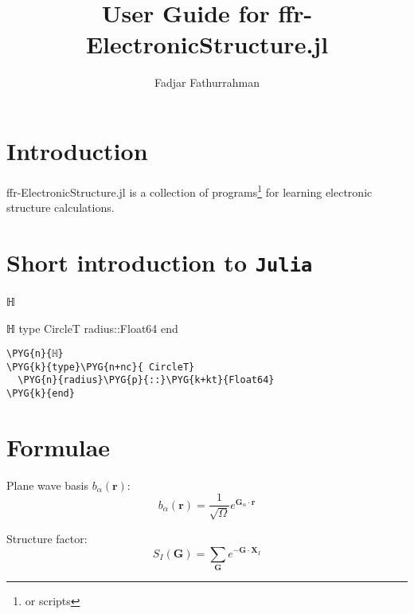 \documentclass[a4paper,12pt]{extarticle}
\begin{document}
\title{User Guide for {\ttfamily ffr-ElectronicStructure.jl}}
\author{Fadjar Fathurrahman}
\date{}
\maketitle

\tableofcontents

\section{Introduction}

{\ttfamily ffr-ElectronicStructure.jl} is a collection of programs\footnote{or scripts}
for learning electronic structure calculations.


\section{Short introduction to {\tt Julia}}

ℍ

\begin{juliacode}
ℍ
type CircleT
  radius::Float64
end
\end{juliacode}

\begin{Verbatim}[commandchars=\\\{\}]
\PYG{n}{ℍ}
\PYG{k}{type}\PYG{n+nc}{ CircleT}
  \PYG{n}{radius}\PYG{p}{::}\PYG{k+kt}{Float64}
\PYG{k}{end}
\end{Verbatim}


\section{Formulae}

Plane wave basis $b_{\alpha}(\mathbf{r})$:
\begin{equation}
b_{\alpha}(\mathbf{r}) = \frac{1}{\sqrt{\Omega}} e^{\mathbf{G}_{\alpha}\cdot\mathbf{r}}
\end{equation}

Structure factor:
\begin{equation}
S_{I}(\mathbf{G}) = \sum_{\mathbf{G}} e^{ -\mathbf{G}\cdot\mathbf{X}_{I} }
\end{equation}
\end{document}
